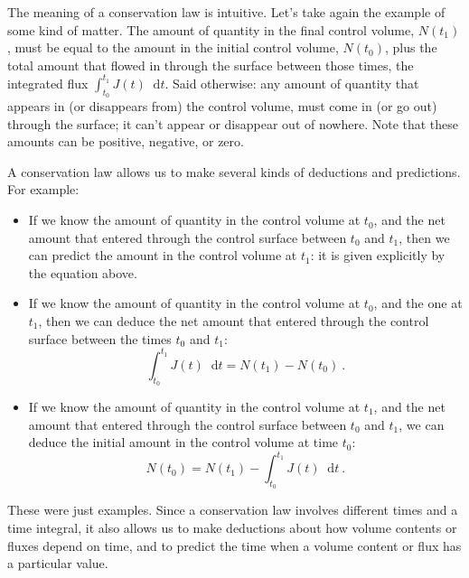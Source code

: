 \documentclass[a4paper,12pt,%
onecolumn,oneside,%
british%
]{memoir}
\newcommand*{\di}{\mathop{}\!\mathrm{d}}%
\renewcommand*{\|}[1][]{\nonscript\:#1\vert\nonscript\:\mathopen{}}
\newcommand*{\yti}{t_{0}}
\newcommand*{\ytf}{t_{1}}
\newcommand*{\dt}{\di t}
\newcommand*{\yN}{N}
\newcommand*{\yJ}{J}
\begin{document}
The meaning of a conservation law is intuitive. Let's take again the example of some kind of matter. The amount of quantity in the final control volume, $\yN(\ytf)$, must be equal to the amount in the initial control volume, $\yN(\yti)$, plus the total amount that flowed in through the surface between those times, the integrated flux $\int_{\yti}^{\ytf}\!\!\yJ(t)\dt$. Said otherwise: any amount of quantity that appears in (or disappears from) the control volume, must come in (or go out) through the surface; it can't appear or disappear out of nowhere. Note that these amounts can be positive, negative, or zero.

A conservation law allows us to make several kinds of deductions and predictions. For example:
\begin{itemize}
\item If we know the amount of quantity in the control volume at $\yti$, and the net amount that entered through the control surface between $\yti$ and $\ytf$, then we can predict the amount in the control volume at $\ytf$: it is given explicitly by the equation above.

\item If we know the amount of quantity in the control volume at $\yti$, and the one at $\ytf$, then we can deduce the net amount that entered through the control surface between the times $\yti$ and $\ytf$:
  \begin{equation*}
    \int_{\yti}^{\ytf}\!\!\yJ(t)\dt = \yN(\ytf) - \yN(\yti) \ .
  \end{equation*}

\item If we know the amount of quantity in the control volume at $\ytf$, and the net amount that entered through the control surface between $\yti$ and $\ytf$, we can deduce the initial amount in the control volume at time $\yti$:
  \begin{equation*}
    \yN(\yti) = \yN(\ytf) - \int_{\yti}^{\ytf}\!\!\yJ(t)\dt \ .
  \end{equation*}
\end{itemize}

These were just examples. Since a conservation law involves different times and a time integral, it also allows us to make deductions about how volume contents or fluxes depend on time, and to predict the time when a volume content or flux has a particular value.
\end{document}
